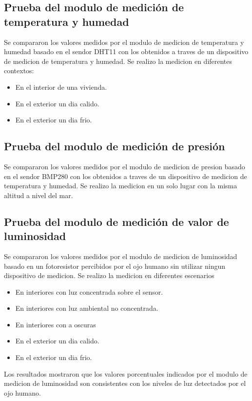 \subsection{Prueba del modulo de medición de temperatura y humedad}

Se compararon los valores medidos por el modulo de medicion de temperatura y humedad basado en el sendor DHT11 con los obtenidos a traves de un dispositivo de medicion de temperatura y humedad. Se realizo la medicion en diferentes contextos:

\begin{itemize}
	\item En el interior de una vivienda.
	\item En el exterior un dia calido.
	\item En el exterior un dia frio.
\end{itemize}


\subsection{Prueba del modulo de medición de presión}

Se compararon los valores medidos por el modulo de medicion de presion basado en el sendor BMP280 con los obtenidos a traves de un dispositivo de medicion de temperatura y humedad. Se realizo la medicion en un solo lugar con la misma altitud a nivel del mar.

\subsection{Prueba del modulo de medición de valor de luminosidad}

Se compararon los valores medidos por el modulo de medicion de luminosidad basado en un fotoresistor percibidos por el ojo humano sin utilizar ningun dispositivo de medicion. Se realizo la medicion en diferentes escenarios

\begin{itemize}
	\item En interiores con luz concentrada sobre el sensor.
	\item En interiores con luz ambiental no concentrada.
	\item En interiores con a oscuras
	\item En el exterior un dia calido.
	\item En el exterior un dia frio.
\end{itemize}

Los resultados mostraron que los valores porcentuales indicados por el modulo de medicion de luminosidad son consistentes con los niveles de luz detectados por el ojo humano.

